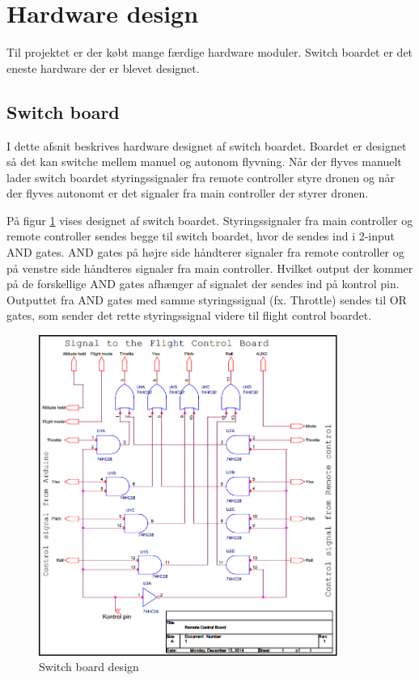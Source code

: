 \section{Hardware design}
\vspace{-0.5cm}
Til projektet er der købt mange færdige hardware moduler. Switch boardet er det eneste hardware der er blevet designet. 

\vspace{-0.3cm}

\subsection{Switch board}
\vspace{-0.4cm}
I dette afsnit beskrives hardware designet af switch boardet. Boardet er designet så det kan switche mellem manuel og autonom flyvning. Når der flyves manuelt lader switch boardet styringssignaler fra remote controller styre dronen og når der flyves autonomt er det signaler fra main controller der styrer dronen.

På figur \ref{fig:switchboard_design} vises designet af switch boardet.
Styringssignaler fra main controller og remote controller sendes begge til switch boardet, hvor de sendes ind i 2-input AND gates. AND gates på højre side håndterer signaler fra remote controller og på venstre side håndteres signaler fra main controller. Hvilket output der kommer på de forskellige AND gates afhænger af signalet der sendes ind på kontrol pin. Outputtet fra AND gates med samme styringssignal (fx. Throttle) sendes til OR gates, som sender det rette styringssignal videre til flight control boardet. 


\begin{figure}[H]
	\centering
	\includegraphics[width=0.87\textwidth]{Billeder/hardware/switch_board_diagram.png}
	\caption{Switch board design}
	\label{fig:switchboard_design}
\end{figure}

